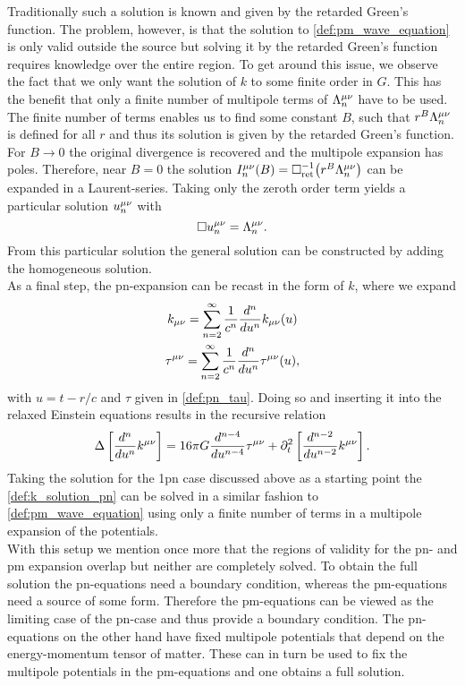 Traditionally such a solution is known and given by the retarded Green's function. The problem, however, is that the solution to \eqref{def:pm_wave_equation} is only valid outside the source but solving it by the retarded Green's function requires knowledge over the entire region. To get around this issue, we observe the fact that we only want the solution of $k$ to some finite order in $G$. This has the benefit that only a finite number of multipole terms of $\Lambda^{\mu\nu}_n$ have to be used. The finite number of terms enables us to find some constant $B$, such that $r^B\Lambda^{\mu\nu}_n$ is defined for all $r$ and thus its solution is given by the retarded Green's function. For $B\to 0$ the original divergence is recovered and the multipole expansion has poles. Therefore, near $B=0$ the solution $I^{\mu\nu}_n{\left( B \right)}=\Box^{-1}_\text{ret}{\left( r^B\Lambda^{\mu\nu}_n \right)}$ can be expanded in a Laurent-series. Taking only the zeroth order term yields a particular solution $u^{\mu\nu}_n$ with
\begin{equation}
\Box u^{\mu\nu}_n=\Lambda^{\mu\nu}_n.
\end{equation}
From this particular solution the general solution can be constructed by adding the homogeneous solution.\medskip\\
As a final step, the \gls{pn}-expansion can be recast in the form of $k$, where we expand
\begin{gather}
k_{\mu\nu} =\sum_{n=2}^\infty \frac{1}{c^n}\frac{d^n}{du^n}k_{\mu\nu}{\left( u \right)}\\
\tau^{\mu\nu}=\sum_{n=2}^\infty \frac{1}{c^n}\frac{d^n}{du^n}\tau^{\mu\nu}{\left( u \right)},
\end{gather}
with $u=t-r/c$ and $\tau$ given in \eqref{def:pn_tau}. Doing so and inserting it into the relaxed Einstein equations results in the recursive relation
\begin{equation}\label{def:k_solution_pn}
\Delta\left[\frac{d^n}{du^n}k^{\mu\nu}\right]=16\pi G\frac{d^{n-4}}{du^{n-4}}\tau^{\mu\nu}+\partial_t^2\left[\frac{d^{n-2}}{du^{n-2}}k^{\mu\nu}\right].
\end{equation}
Taking the solution for the 1\gls{pn} case discussed above as a starting point the \eqref{def:k_solution_pn} can be solved in a similar fashion to \eqref{def:pm_wave_equation} using only a finite number of terms in a multipole expansion of the potentials.\medskip\\
With this setup we mention once more that the regions of validity for the \gls{pn}- and \gls{pm} expansion overlap but neither are completely solved. To obtain the full solution the \gls{pn}-equations need a boundary condition, whereas the \gls{pm}-equations need a source of some form. Therefore the \gls{pm}-equations can be viewed as the limiting case of the \gls{pn}-case and thus provide a boundary condition. The \gls{pn}-equations on the other hand have fixed multipole potentials that depend on the energy-momentum tensor of matter. These can in turn be used to fix the multipole potentials in the \gls{pm}-equations and one obtains a full solution.\\
